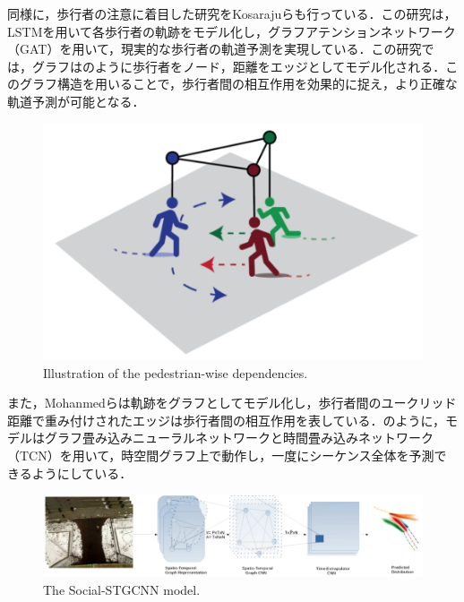 \protect{}

同様に，歩行者の注意に着目した研究をKosarajuら\cite{s-bigat}も行っている．この研究は，LSTMを用いて各歩行者の軌跡をモデル化し，グラフアテンションネットワーク（GAT）を用いて，現実的な歩行者の軌道予測を実現している．この研究では，グラフはのように歩行者をノード，距離をエッジとしてモデル化される．このグラフ構造を用いることで，歩行者間の相互作用を効果的に捉え，より正確な軌道予測が可能となる．
\vspace{20pt}
\begin{figure}[hbtp]
     \centering
    \includegraphics[keepaspectratio, scale=0.4]
         {images/s-bigat.png}
\caption{Illustration of the pedestrian-wise dependencies.\protect\footnotemark[3]}
    \label{Fig:s-bigat}
\end{figure}

\protect{}

また，Mohanmedら\cite{s-stgcnn}は軌跡をグラフとしてモデル化し，歩行者間のユークリッド距離で重み付けされたエッジは歩行者間の相互作用を表している．のように，モデルはグラフ畳み込みニューラルネットワークと時間畳み込みネットワーク（TCN）を用いて，時空間グラフ上で動作し，一度にシーケンス全体を予測できるようにしている．

\vspace{20pt}

\begin{figure}[hbtp]
     \centering
    \includegraphics[keepaspectratio, scale=0.39]
         {images/s-stgcnn.png}
    \caption{The Social-STGCNN model.\protect\footnotemark[4]}
    \label{Fig:s-stgcnn}
\end{figure}

